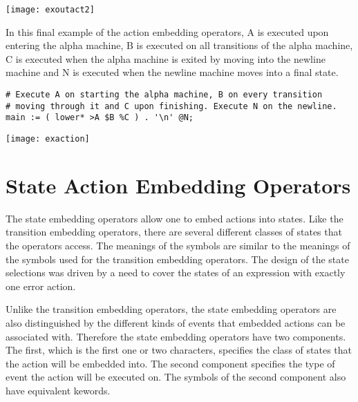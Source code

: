 \documentclass[letterpaper,11pt,oneside]{book}
\newcommand{\verbspace}{\vspace{10pt}}
\newcommand{\graphspace}{\vspace{10pt}}
\newenvironment{inline_code}{\def\baselinestretch{1}\vspace{12pt}\small}{}
\begin{document}
\graphspace
\begin{center}
\texttt{[image: exoutact2]}
\end{center}
\graphspace

In this final example of the action embedding operators, A is executed upon entering
the alpha machine, B is executed on all transitions of the
alpha machine, C is executed when the alpha machine is exited by moving into the
newline machine and N is executed when the newline machine moves into a final
state.  

\begin{inline_code}
\begin{verbatim}
# Execute A on starting the alpha machine, B on every transition 
# moving through it and C upon finishing. Execute N on the newline.
main := ( lower* >A $B %C ) . '\n' @N;
\end{verbatim}
\end{inline_code}
\verbspace
% }%%
% END GENERATE

\graphspace
\begin{center}
\texttt{[image: exaction]}
\end{center}
\graphspace


\section{State Action Embedding Operators}

The state embedding operators allow one to embed actions into states. Like the
transition embedding operators, there are several different classes of states
that the operators access. The meanings of the symbols are similar to the
meanings of the symbols used for the transition embedding operators. The design
of the state selections was driven by a need to cover the states of an
expression with exactly one error action.

Unlike the transition embedding operators, the state embedding operators are
also distinguished by the different kinds of events that embedded actions can
be associated with. Therefore the state embedding operators have two
components.  The first, which is the first one or two characters, specifies the
class of states that the action will be embedded into. The second component
specifies the type of event the action will be executed on. The symbols of the
second component also have equivalent kewords. 
\end{document}

